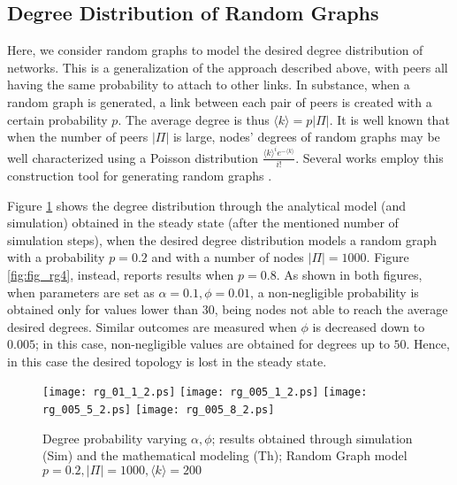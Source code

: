 \documentclass[a4paper,twosided]{article}
\begin{document}
\subsection{Degree Distribution of Random Graphs}

Here, we consider random graphs to model the desired degree distribution of networks. This is a generalization of the approach described above, with peers all having the same probability to attach to other links. 
In substance, when a random graph is generated, a link between each pair of peers is created with a certain probability $p$. The average degree is thus $\langle k \rangle = p |\Pi|$. It is well known that when the number of peers $|\Pi|$ is large, nodes' degrees of random graphs may be well characterized using a Poisson distribution $\frac{\langle k \rangle^i e^{-\langle k \rangle}}{i!}$.
Several works employ this construction tool for generating random graphs \cite{newmanHandbook}.

Figure \ref{fig:fig_rg3} shows the degree distribution through the analytical model (and simulation) obtained in the steady state (after the mentioned number of simulation steps), when the desired degree distribution 
models a random graph with a probability $p=0.2$ and with a number of nodes $|\Pi| = 1000$. Figure \ref{fig:fig_rg4}, instead, reports results when $p=0.8$. 
As shown in both figures, when parameters are set as $\alpha=0.1, \phi=0.01$, a non-negligible probability is obtained only for values lower than $30$, being nodes not able to reach the average desired degrees. Similar outcomes are measured when $\phi$ is decreased down to $0.005$; in this case, non-negligible values are obtained for degrees up to $50$. Hence, in this case the desired topology is lost in the steady state.


\begin{figure}
   \centering
   \texttt{[image: rg\_01\_1\_2.ps]}
   \texttt{[image: rg\_005\_1\_2.ps]}
   \texttt{[image: rg\_005\_5\_2.ps]}
   \texttt{[image: rg\_005\_8\_2.ps]}
   \caption{Degree probability varying $\alpha, \phi$; results obtained through simulation (Sim) and the mathematical modeling (Th); Random Graph model $p=0.2, |\Pi|=1000, \langle k \rangle = 200$}   
   \label{fig:fig_rg3}
\end{figure}
\end{document}

